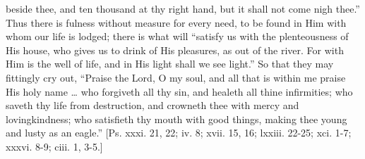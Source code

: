 beside thee, and ten thousand at thy right hand, but it shall not come
nigh thee.'' Thus there is fulness without measure for every need,
to be found in Him with whom our life is lodged; there is what will
``satisfy us with the plenteousness of His house, who gives us to
drink of His pleasures, as out of the river. For with Him is the well
of life, and in His light shall we see light.'' So that they may
fittingly cry out, ``Praise the Lord, O my soul, and all that is
within me praise His holy name … who forgiveth all thy sin, and
healeth all thine infirmities; who saveth thy life from destruction,
and crowneth thee with mercy and lovingkindness; who satisfieth thy
mouth with good things, making thee young and lusty as an eagle.''
[Ps. xxxi. 21, 22; iv. 8; xvii. 15, 16; lxxiii. 22-25; xci. 1-7; xxxvi.
8-9; ciii. 1, 3-5.]

